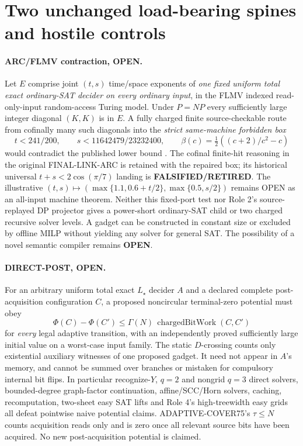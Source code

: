 \documentclass[11pt]{article}
\begin{document}
\section{Two unchanged load-bearing spines and hostile controls}
\paragraph{ARC/FLMV contraction, OPEN.}
Let $E$ comprise joint $(t,s)$ time/space exponents of \emph{one fixed uniform total exact ordinary-SAT decider on every ordinary input}, in the FLMV indexed read-only-input random-access Turing model. Under $P=NP$ every sufficiently large integer diagonal $(K,K)$ is in $E$. A fully charged finite source-checkable route from cofinally many such diagonals into the \emph{strict same-machine forbidden box}
\[
\boxed{t<241/200,\qquad s<11642479/23232400,\qquad
\beta(c)=\tfrac12((c+2)/c^2-c)}
\]
would contradict the published lower bound \cite{flmv}. The cofinal finite-hit reasoning in the original FINAL-LINK-ARC is retained with the repaired box; its historical universal $t+s<2\cos(\pi/7)$ landing is \textbf{FALSIFIED/RETIRED}. The illustrative $(t,s)\mapsto(\max\{1.1,0.6+t/2\},\max\{0.5,s/2\})$ remains OPEN as an all-input machine theorem. Neither this fixed-port test nor Role 2's source-replayed DP projector gives a power-short ordinary-SAT child or two charged recursive solver levels. A gadget can be constructed in constant size or excluded by offline MILP without yielding any solver for general SAT. The possibility of a novel semantic compiler remains \textbf{OPEN}.

\paragraph{DIRECT-POST, OPEN.}
For an arbitrary uniform total exact $L_\star$ decider $A$ and a declared complete post-acquisition configuration $C$, a proposed noncircular terminal-zero potential must obey
\[
\Phi(C)-\Phi(C')\le \Gamma(N)\,\operatorname{chargedBitWork}(C,C')
\]
for \emph{every} legal adaptive transition, with an independently proved sufficiently large initial value on a worst-case input family. The static $D$-crossing counts only existential auxiliary witnesses of one proposed gadget. It need not appear in $A$'s memory, and cannot be summed over branches or mistaken for compulsory internal bit flips. In particular recognize-$Y$, $q=2$ and nongrid $q=3$ direct solvers, bounded-degree graph-factor continuation, affine/SCC/Horn solvers, caching, recomputation, two-sheet easy SAT lifts and Role 4's high-treewidth easy grids all defeat pointwise naive potential claims. ADAPTIVE-COVER75's $\tau\le N$ counts acquisition reads only and is zero once all relevant source bits have been acquired. No new post-acquisition potential is claimed.
\end{document}

